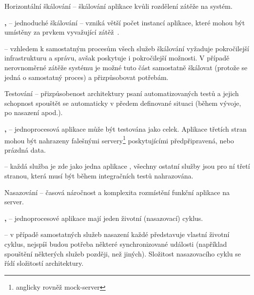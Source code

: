 \begin{dl}
   \item[Horizontální škálování] – škálování aplikace kvůli rozdělení zátěže na systém.
\end{dl}
\begin{ul}
   \item \textbf{, } – jednoduché škálování – vzniká větší počet instancí aplikace, které mohou být umístěny za prvkem vyvažující zátěž~\cite{msachris}.
   \item \textbf{} – vzhledem k samostatným procesům všech služeb škálování vyžaduje pokročilejší infrastrukturu a správu, avšak poskytuje i pokročilejší možnosti.
   V případě nerovnoměrné zátěže systému je možné tuto část samostatně škálovat (protože se jedná o samostatný proces) a přizpůsobovat potřebám.
\end{ul}

\newpage

\begin{dl}
   \item[Testování] – přizpůsobenost architektury psaní automatizovaných testů a jejich schopnost spouštět se automaticky v předem definované situaci (během vývoje, po nasazení apod.).
\end{dl}
\begin{ul}
   \item \textbf{, } – jednoprocesová aplikace může být testována jako celek.
   Aplikace třetích stran mohou být nahrazeny falešnými servery\footnote{anglicky rovněž mock-server} poskytujícími předpřipravená, nebo prázdná data.
   \item \textbf{} – každá služba je zde jako jedna aplikace , všechny ostatní služby jsou pro ní třetí stranou, která musí být během integračních testů nahrazována.
\end{ul}

\begin{dl}
   \item[Nasazování] – časová náročnost a komplexita rozmístění funkční aplikace na server.
\end{dl}
\begin{ul}
   \item \textbf{, } – jednoprocesové aplikace mají jeden životní (nasazovací) cyklus.
   \item \textbf{} – v případě samostatných služeb nasazení každé představuje vlastní životní cyklus, nejspíš budou potřeba některé synchronizované události (například spouštění některých služeb později, než jiných).
   Složitost nasazovacího cyklu se řídí složitostí architektury.
\end{ul}


